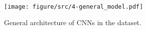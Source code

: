 \begin{figure}
    \centering
    \texttt{[image: figure/src/4-general\_model.pdf]}
    \caption{General architecture of CNNs in the dataset.}
    \label{fig:general model}
\end{figure}